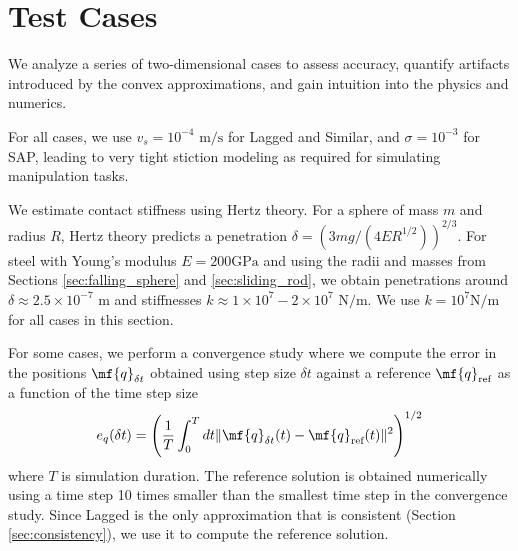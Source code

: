 \section{Test Cases}
\label{sec:results}

We analyze a series of two-dimensional cases to assess accuracy,
quantify artifacts introduced by the convex approximations, and gain
intuition into the physics and numerics.

For all cases, we use $v_s=10^{-4}\text{ m}/\text{s}$ for Lagged and Similar,
and $\sigma=10^{-3}$ for SAP, leading to very tight stiction modeling as
required for simulating manipulation tasks.

We estimate contact stiffness using Hertz theory. For a sphere of mass $m$ and
radius $R$, Hertz theory predicts a penetration
$\delta=(3mg/(4ER^{1/2}))^{2/3}$. For steel with Young's modulus $E=200\text{
GPa}$ and using the radii and masses from Sections \ref{sec:falling_sphere} and
\ref{sec:sliding_rod}, we obtain penetrations around $\delta\approx
2.5\times10^{-7}\text{ m}$ and stiffnesses $k\approx 1\times
10^{7}-2\times 10^{7}\text{ N}/\text{m}$. We use $k = 10^{7}\text{
N}/\text{m}$ for all cases in this section.

For some cases, we perform a convergence study where we compute the
error in the positions $\mf{q}_{\delta t}$ obtained using step size $\delta t$
against a reference $\mf{q}_\text{ref}$ as a function of the time step size
\begin{equation*}
    e_q(\delta t) = \left(\frac{1}{T}\int_0^T dt\Vert\mf{q}_{\delta t}(t)-\mf{q}_\text{ref}(t)\Vert^2\right)^{1/2}
\end{equation*}
where $T$ is simulation duration. The reference solution is obtained numerically
using a time step 10 times smaller than the smallest time step in the
convergence study. Since Lagged is the only approximation that is consistent
(Section \ref{sec:consistency}), we use it to compute the reference solution.







